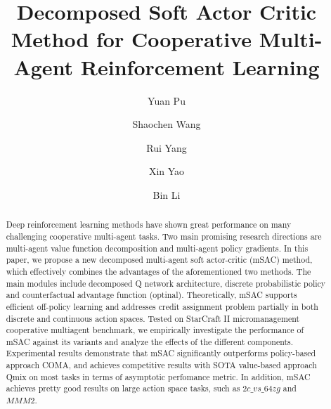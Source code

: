 \documentclass[runningheads]{llncs}
\begin{document}
\title{Decomposed Soft Actor Critic Method for Cooperative Multi-Agent Reinforcement Learning}\author{Yuan Pu\and
Shaochen Wang \and
Rui Yang\and
Xin Yao\and
Bin Li  }


\maketitle              \begin{abstract}
Deep reinforcement learning methods have shown great performance on many challenging cooperative multi-agent tasks. Two main promising research directions are multi-agent value function decomposition and multi-agent policy gradients. In this paper, we propose a new decomposed multi-agent soft actor-critic (mSAC) method, which effectively combines
the advantages of the aforementioned two methods.
The main modules include decomposed Q network architecture, discrete probabilistic policy and counterfactual advantage function (optinal).
Theoretically, mSAC supports efficient off-policy learning and addresses credit assignment problem partially in both discrete and continuous action spaces. Tested on StarCraft II micromanagement cooperative multiagent benchmark, we empirically investigate the performance of mSAC against its variants and analyze the effects of the different components. Experimental results demonstrate that mSAC significantly outperforms policy-based approach COMA, and achieves competitive results with SOTA value-based approach Qmix on most tasks in terms of asymptotic perfomance metric. In addition, mSAC achieves pretty good results on large action space tasks, such as $2c\_vs\_64zg$ and $MMM2$.

\end{abstract}
\end{document}
